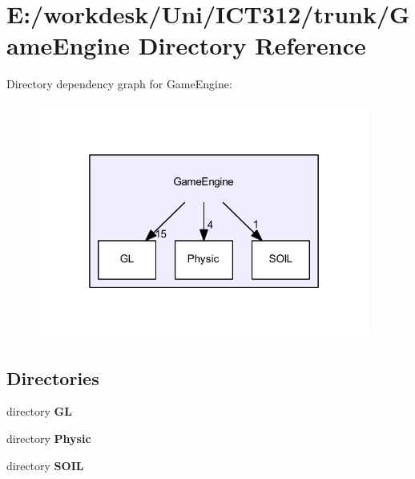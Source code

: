 \section{E\+:/workdesk/\+Uni/\+I\+C\+T312/trunk/\+Game\+Engine Directory Reference}
\label{dir_b304f6c6273f651fae44313af9022017}
Directory dependency graph for Game\+Engine\+:\nopagebreak
\begin{figure}[H]
\begin{center}
\leavevmode
\includegraphics[width=310pt]{dir_b304f6c6273f651fae44313af9022017_dep}
\end{center}
\end{figure}
\subsection*{Directories}
\begin{DoxyCompactItemize}
\item 
directory {\bf G\+L}
\item 
directory {\bf Physic}
\item 
directory {\bf S\+O\+I\+L}
\end{DoxyCompactItemize}
